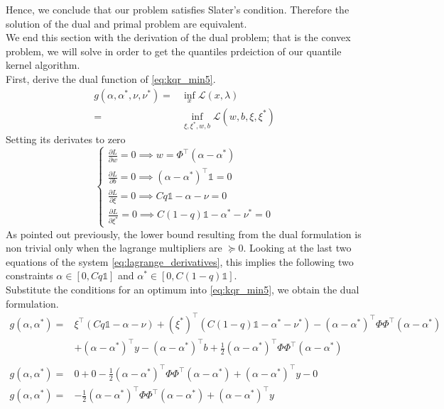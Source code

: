 Hence, we conclude that our problem satisfies Slater's condition. Therefore the solution of the dual and primal problem are equivalent.
\\
We end this section with the derivation of the dual problem; that is the convex problem, we will solve in order to get the quantiles prdeiction of our quantile kernel algorithm.
\\
First, derive the dual function of \ref{eq:kqr_min5}.
\begin{equation}
    \begin{aligned}
        g(\alpha, \alpha^*, \nu, \nu^*)=& \inf_x \mathcal{L}(x,\lambda)\\
    = & \inf_{\xi, \xi^*, w, b} \mathcal{L}(w,b,\xi,\xi^*)
\end{aligned}
\end{equation}
Setting its derivates to zero
\begin{equation}\label{eq:lagrange_derivatives}
    \begin{cases}
        \frac{\partial L}{\partial w}=0 \implies w=\Phi^\intercal(\alpha-\alpha^*)
        \\
        \frac{\partial L}{\partial b}=0 \implies (\alpha-\alpha^*)^\intercal\mathbb{1}=0
        \\
        \frac{\partial L}{\partial \xi}=0 \implies Cq \mathbb{1}-\alpha- \nu=0
        \\
        \frac{\partial L}{\partial \xi^*}=0 \implies C(1-q)\mathbb{1} -\alpha^* -\nu^*=0
    \end{cases}
\end{equation}
As pointed out previously, the lower bound resulting from the dual formulation is non trivial only when the lagrange multipliers are $\succeq 0$. Looking at the last two equations of the system \ref{eq:lagrange_derivatives}, this implies the following two constraints $\alpha \in [0, Cq\mathbb{1}]$ and $\alpha^*\in [0, C(1-q)\mathbb{1}]$.
\\
Substitute the conditions for an optimum into \ref{eq:kqr_min5}, we obtain the dual formulation.
\begin{equation}
    \begin{aligned}
        g(\alpha, \alpha^*)=& \xi^\intercal(Cq\mathbb{1}-\alpha -\nu)+(\xi^*)^\intercal(C(1-q)\mathbb{1}-\alpha^*-\nu^*)-(\alpha-\alpha^*)^\intercal \Phi\Phi^\intercal(\alpha-\alpha^*)
        \\
        & +(\alpha-\alpha^*)^\intercal y-(\alpha-\alpha^*)^\intercal b+\frac{1}{2}(\alpha-\alpha^*)^\intercal \Phi\Phi^\intercal(\alpha-\alpha^*)
        \\
        \\
        g(\alpha, \alpha^*)=& 0+0-\frac{1}{2}(\alpha-\alpha^*)^\intercal \Phi\Phi^\intercal(\alpha-\alpha^*)+(\alpha-\alpha^*)^\intercal y-0
        \\
        g(\alpha, \alpha^*)=& -\frac{1}{2}(\alpha-\alpha^*)^\intercal \Phi\Phi^\intercal(\alpha-\alpha^*)+(\alpha-\alpha^*)^\intercal y
    \end{aligned}
\end{equation}
